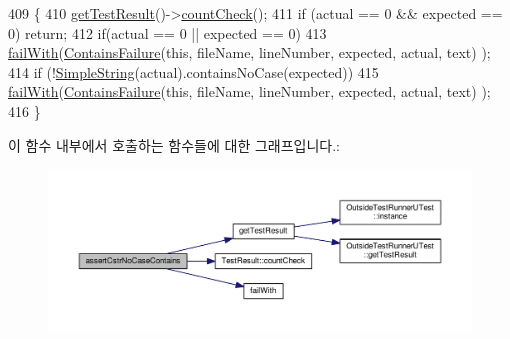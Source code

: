 \begin{DoxyCode}
409 \{
410     \hyperlink{class_utest_shell_a34c525b685e30431750d9e355fdfff0c}{getTestResult}()->\hyperlink{class_test_result_a58577489a2418efb4c440761e533f2e7}{countCheck}();
411     \textcolor{keywordflow}{if} (actual == 0 && expected == 0) \textcolor{keywordflow}{return};
412     \textcolor{keywordflow}{if}(actual == 0 || expected == 0)
413         \hyperlink{class_utest_shell_ad50ae28f5ad9f1d224832cb1f89365a7}{failWith}(\hyperlink{class_contains_failure}{ContainsFailure}(\textcolor{keyword}{this}, fileName, lineNumber, expected, actual, text)
      );
414     \textcolor{keywordflow}{if} (!\hyperlink{class_simple_string}{SimpleString}(actual).containsNoCase(expected))
415         \hyperlink{class_utest_shell_ad50ae28f5ad9f1d224832cb1f89365a7}{failWith}(\hyperlink{class_contains_failure}{ContainsFailure}(\textcolor{keyword}{this}, fileName, lineNumber, expected, actual, text)
      );
416 \}
\end{DoxyCode}


이 함수 내부에서 호출하는 함수들에 대한 그래프입니다.\+:
\nopagebreak
\begin{figure}[H]
\begin{center}
\leavevmode
\includegraphics[width=350pt]{class_utest_shell_afca15ab751bda33d3784efe4b06bf875_cgraph}
\end{center}
\end{figure}



